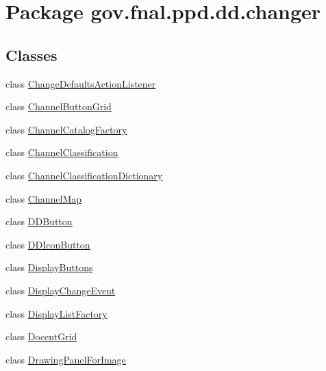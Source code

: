 \hypertarget{namespacegov_1_1fnal_1_1ppd_1_1dd_1_1changer}{\section{Package gov.\-fnal.\-ppd.\-dd.\-changer}
\label{namespacegov_1_1fnal_1_1ppd_1_1dd_1_1changer}
}
\subsection*{Classes}
\begin{DoxyCompactItemize}
\item 
class \hyperlink{classgov_1_1fnal_1_1ppd_1_1dd_1_1changer_1_1ChangeDefaultsActionListener}{Change\-Defaults\-Action\-Listener}
\item 
class \hyperlink{classgov_1_1fnal_1_1ppd_1_1dd_1_1changer_1_1ChannelButtonGrid}{Channel\-Button\-Grid}
\item 
class \hyperlink{classgov_1_1fnal_1_1ppd_1_1dd_1_1changer_1_1ChannelCatalogFactory}{Channel\-Catalog\-Factory}
\item 
class \hyperlink{classgov_1_1fnal_1_1ppd_1_1dd_1_1changer_1_1ChannelClassification}{Channel\-Classification}
\item 
class \hyperlink{classgov_1_1fnal_1_1ppd_1_1dd_1_1changer_1_1ChannelClassificationDictionary}{Channel\-Classification\-Dictionary}
\item 
class \hyperlink{classgov_1_1fnal_1_1ppd_1_1dd_1_1changer_1_1ChannelMap}{Channel\-Map}
\item 
class \hyperlink{classgov_1_1fnal_1_1ppd_1_1dd_1_1changer_1_1DDButton}{D\-D\-Button}
\item 
class \hyperlink{classgov_1_1fnal_1_1ppd_1_1dd_1_1changer_1_1DDIconButton}{D\-D\-Icon\-Button}
\item 
class \hyperlink{classgov_1_1fnal_1_1ppd_1_1dd_1_1changer_1_1DisplayButtons}{Display\-Buttons}
\item 
class \hyperlink{classgov_1_1fnal_1_1ppd_1_1dd_1_1changer_1_1DisplayChangeEvent}{Display\-Change\-Event}
\item 
class \hyperlink{classgov_1_1fnal_1_1ppd_1_1dd_1_1changer_1_1DisplayListFactory}{Display\-List\-Factory}
\item 
class \hyperlink{classgov_1_1fnal_1_1ppd_1_1dd_1_1changer_1_1DocentGrid}{Docent\-Grid}
\item 
class \hyperlink{classgov_1_1fnal_1_1ppd_1_1dd_1_1changer_1_1DrawingPanelForImage}{Drawing\-Panel\-For\-Image}

\end{DoxyCompactItemize}
